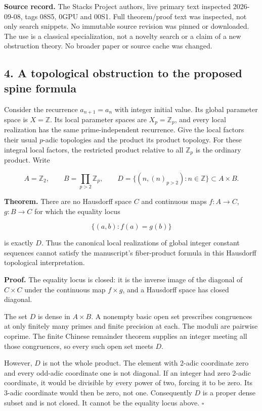 \textbf{Source record.} The Stacks Project authors, live primary text
inspected 2026-09-08, tags 08S5, 0GPU and 00S1. Full theorem/proof text
was inspected, not only search snippets. No immutable source revision
was pinned or downloaded. The use is a classical specialization, not a
novelty search or a claim of a new obstruction theory. No broader paper
or source cache was changed.

\hypertarget{native:a-topological-obstruction-to-the-proposed-spine-formula}{%
\subsection{4. A topological obstruction to the proposed spine
formula}\label{native:a-topological-obstruction-to-the-proposed-spine-formula}}

Consider the recurrence \(a_{n+1}=a_n\) with integer initial value. Its
global parameter space is \(X=\mathbb Z\). Its local parameter spaces
are \(X_p=\mathbb Z_p\), and every local realization has the same
prime-independent recurrence. Give the local factors their usual
\(p\)-adic topologies and the product its product topology. For these
integral local factors, the restricted product relative to all
\(\mathbb Z_p\) is the ordinary product. Write

\[A=\mathbb Z_2,\qquad B=\prod_{p>2}\mathbb Z_p,\qquad D=\{(n,(n)_{p>2}):n\in\mathbb Z\}\subset A\times B.\]

\textbf{Theorem.} There are no Hausdorff space \(C\) and continuous maps
\(f:A\to C\), \(g:B\to C\) for which the equality locus

\[\{(a,b):f(a)=g(b)\}\]

is exactly \(D\). Thus the canonical local realizations of global
integer constant sequences cannot satisfy the manuscript's fiber-product
formula in this Hausdorff topological interpretation.

\textbf{Proof.} The equality locus is closed: it is the inverse image of
the diagonal of \(C\times C\) under the continuous map \(f\times g\),
and a Hausdorff space has closed diagonal.

The set \(D\) is dense in \(A\times B\). A nonempty basic open set
prescribes congruences at only finitely many primes and finite precision
at each. The moduli are pairwise coprime. The finite Chinese remainder
theorem supplies an integer meeting all those congruences, so every such
open set meets \(D\).

However, \(D\) is not the whole product. The element with 2-adic
coordinate zero and every odd-adic coordinate one is not diagonal. If an
integer had zero 2-adic coordinate, it would be divisible by every power
of two, forcing it to be zero. Its 3-adic coordinate would then be zero,
not one. Consequently \(D\) is a proper dense subset and is not closed.
It cannot be the equality locus above. \(\square\)

